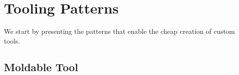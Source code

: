 \documentclass[acmsmall,screen,authorversion,nonacm]{acmart} %
\newcommand\rb[1]{\nbc{Ralf}{#1}{teal}}
\newcommand\wc[1]{\nbc{Ward}{#1}{teal}}
\newcommand\cp[1]{\nbe{Cesare}{#1}{olive}} %
\newcommand\ws[1]{\nbe{Workshop}{#1}{teal}} %
\newcommand{\pattern}[2]{\needlines{10}
\subsection*{#1}\label{pat:#2}}
\begin{document}
\section{Tooling Patterns}\label{sec:tooling}

We start by presenting the patterns that enable the cheap creation of custom tools.





\pattern{Moldable Tool}{MoldableTool}
\end{document}

